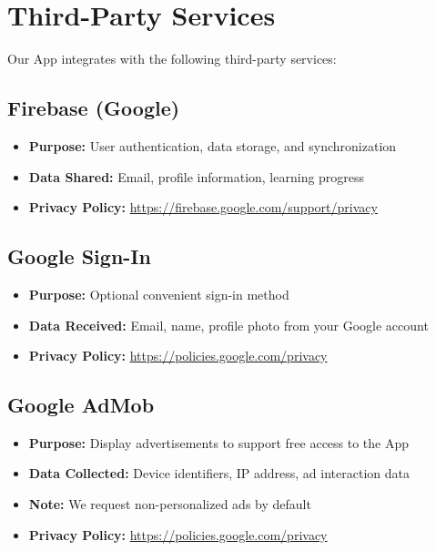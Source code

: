 \documentclass[11pt,a4paper]{article}
\begin{document}
\section{Third-Party Services}

Our App integrates with the following third-party services:

\subsection{Firebase (Google)}

\begin{itemize}[leftmargin=2em]
    \item \textbf{Purpose:} User authentication, data storage, and synchronization
    \item \textbf{Data Shared:} Email, profile information, learning progress
    \item \textbf{Privacy Policy:} \url{https://firebase.google.com/support/privacy}
\end{itemize}

\subsection{Google Sign-In}

\begin{itemize}[leftmargin=2em]
    \item \textbf{Purpose:} Optional convenient sign-in method
    \item \textbf{Data Received:} Email, name, profile photo from your Google account
    \item \textbf{Privacy Policy:} \url{https://policies.google.com/privacy}
\end{itemize}

\subsection{Google AdMob}

\begin{itemize}[leftmargin=2em]
    \item \textbf{Purpose:} Display advertisements to support free access to the App
    \item \textbf{Data Collected:} Device identifiers, IP address, ad interaction data
    \item \textbf{Note:} We request non-personalized ads by default
    \item \textbf{Privacy Policy:} \url{https://policies.google.com/privacy}
\end{itemize}
\end{document}
